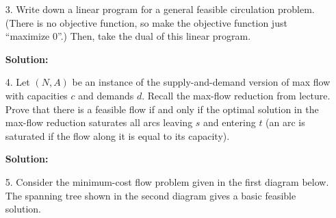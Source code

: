 \documentclass{article}
\begin{document}
\begin{enumerate}
    \newpage

    \item[3.] Write down a linear program for a general feasible circulation problem. (There is no objective function, so make the objective function just ``maximize 0''.)
    Then, take the dual of this linear program.

    \textbf{Solution:} \\



    \newpage

    \item[4.] Let $(N, A)$ be an instance of the supply-and-demand version of max flow with capacities $c$ and demands $d$. Recall the max-flow reduction from lecture. Prove that there is a feasible flow if and only if the optimal solution in the max-flow reduction saturates all arcs leaving $s$ and entering $t$ (an arc is saturated if the flow along it is equal to its capacity).

    \textbf{Solution:} \\



    \newpage

    \item[5.] Consider the minimum-cost flow problem given in the first diagram below. The spanning tree shown in the second diagram gives a basic feasible solution.

    \begin{figure}[h]
    \centering
        \begin{subfigure}
            \centering
\end{subfigure}
\end{figure}
\end{enumerate}
\end{document}
